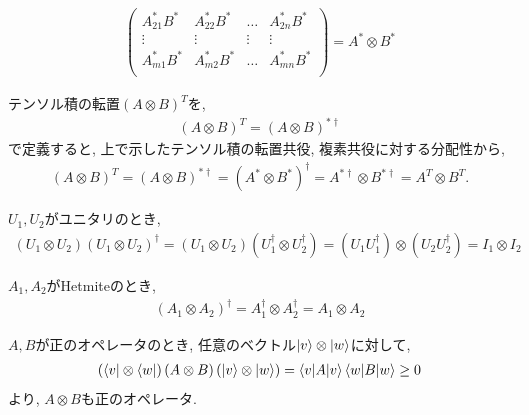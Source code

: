 \begin{ex}
\begin{align*}
\begin{pmatrix}
            A_{21}^*B^*  & A_{22}^*B^* & \dots  & A_{2n}^*B^* \\
            \vdots       & \vdots      & \vdots & \vdots      \\
            A_{m1}^*B^*  & A_{m2}^*B^* & \dots  & A_{mn}^*B^* \\
        \end{pmatrix}
        =
        A^* \otimes B^*
    \end{align*}
    \par
    テンソル積の転置$\left(A \otimes B \right)^T$を,
    \begin{align*}
        \left(A \otimes B \right)^T
        =
        \left(A \otimes B \right)^{*\dagger}
    \end{align*}
    で定義すると, 上で示したテンソル積の転置共役, 複素共役に対する分配性から,
    \begin{align*}
        \left(A \otimes B \right)^T
        =
        \left(A \otimes B \right)^{*\dagger}
        =
        \left(A^* \otimes B^* \right)^{\dagger}
        =
        A^{*\dagger} \otimes B^{*\dagger}
        =
        A^T \otimes B^T.
    \end{align*}
\end{ex}

\begin{ex}
    \label{ex2.29}
    $U_1, U_2$がユニタリのとき,
    \begin{align*}
        (U_1 \otimes U_2)(U_1 \otimes U_2)^\dagger
        =
        (U_1 \otimes U_2)(U_1^\dagger\otimes U_2^\dagger)
        =
        (U_1U_1^\dagger) \otimes (U_2U_2^\dagger)
        =
        I_1 \otimes I_2
    \end{align*}
\end{ex}

\begin{ex}
    \label{ex2.30}
    $A_1, A_2$がHetmiteのとき,
    \begin{align*}
        (A_1 \otimes A_2)^\dagger
        =
        A_1^\dagger \otimes A_2^\dagger
        =
        A_1 \otimes A_2
    \end{align*}
\end{ex}

\begin{ex}
    \label{ex2.31}
    $A, B$が正のオペレータのとき, 任意のベクトル$\ket{v}\otimes \ket{w}$に対して,
    \begin{align*}
        \left( \bra{v}\otimes \bra{w} \right)
        (A \otimes B )
        \left( \ket{v}\otimes \ket{w} \right)
        =
        \braket{v|A|v}
        \braket{w|B|w}
        \geq 0
    \end{align*}
    より, $A \otimes B$も正のオペレータ.
\end{ex}

